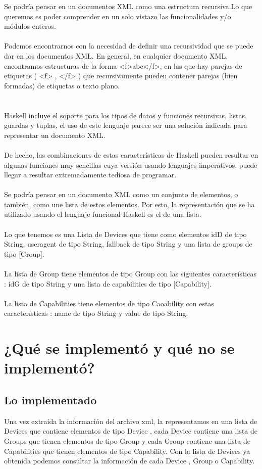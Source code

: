 \documentclass[11pt]{article} %
\begin{document}
Se podría pensar en un documentos XML como una estructura recursiva.Lo que queremos es poder  comprender en un solo vistazo las funcionalidades y/o módulos enteros.\\ \\
Podemos encontrarnos con la necesidad de definir una recursividad que se puede dar en los documentos XML. 
En general, en cualquier documento XML, encontramos estructuras de la forma
<f>abc</f>, en las que hay parejas de etiquetas  ( <f> , </f> ) que recursivamente pueden
contener parejas (bien formadas) de etiquetas o texto plano.\\ \\ \\
Haskell incluye el soporte para los tipos de datos y funciones recursivas, listas, guardas y tuplas, el uso de este lenguaje parece ser una solución indicada para representar un documento XML. \\ \\ De hecho, las combinaciones de estas características de Haskell pueden resultar en algunas funciones muy sencillas cuya versión usando lenguajes imperativos, puede llegar a resultar extremadamente tediosa de programar.
\\ \\
Se podría pensar en un documento XML como un conjunto de elementos, o también, como une lista de estos elementos. Por esto, la representación que se ha utilizado usando el lenguaje funcional Haskell es el de una lista.
 \\ \\
Lo que tenemos es una Lista de Devices que tiene como elementos  idD de tipo  String, useragent de tipo  String, fallback de tipo String y una lista de  groups de tipo [Group].\\ \\
La lista de Group tiene  elementos  de tipo Group con las siguientes características : idG de tipo  String y  una lista de capabilities de tipo [Capability].\\ \\
La lista de Capabilities tiene elementos de tipo Caoability con estas características : name de tipo  String y value de tipo  String.

\section{¿Qué se implementó y qué no se implementó? }
\subsection{Lo implementado} 
Una vez extraída la información del archivo xml, la representamos en una lista de Devices que contiene elementos de tipo Device , cada  Device contiene una lista de Groups que tienen elementos de tipo Group y cada Group contiene una lista  de  Capabilities que tienen elementos de tipo Capability.  
Con la lista de Devices  ya obtenida podemos consultar la información de cada Device , Group o Capability. 
\end{document}
